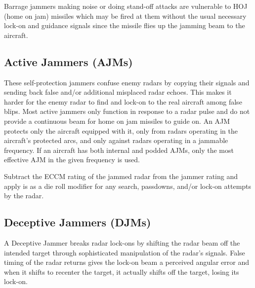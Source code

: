 

Barrage jammers making noise or doing stand-off attacks are vulnerable to HOJ (home on jam) missiles which may be fired at them without the usual necessary lock-on and guidance signals since the missile flies up the jamming beam to the aircraft.


\subsection{Active Jammers (AJMs)}

These self-protection jammers confuse enemy radars by copying their signals and sending back false and/or additional misplaced radar echoes. This makes it harder for the enemy radar to find and lock-on to the real aircraft among false blips. Most active jammers only function in response to a radar pulse and do not provide a continuous beam for home on jam missiles to guide on. An AJM protects only the aircraft equipped with it, only from radars operating in the aircraft's protected arcs, and only against radars operating in a jammable frequency. If an aircraft has both internal and podded AJMs, only the most effective AJM in the given frequency is used.

Subtract the ECCM rating of the jammed radar from the  jammer rating and apply is as a die roll modifier for any search, passdowns, and/or lock-on attempts by the radar.


\subsection{Deceptive Jammers (DJMs)}
\label{rule:deceptive-jammers}

A Deceptive Jammer breaks radar lock-ons by shifting the radar beam off the intended target through sophisticated manipulation of the radar's signals. False timing of the radar returns gives the lock-on beam a perceived angular error and when it shifts to recenter the target, it actually shifts off the target, losing its lock-on.

